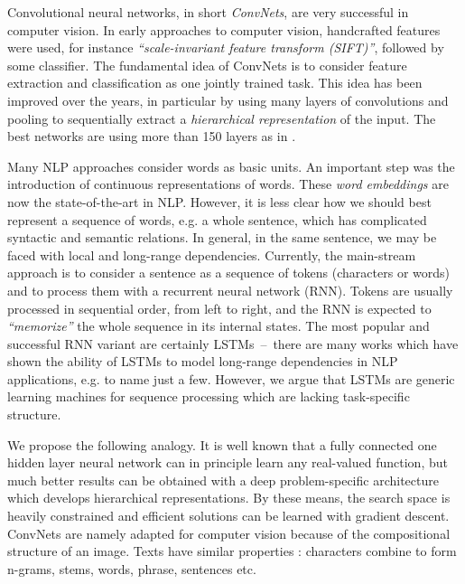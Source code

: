 \documentclass[a4paper,11pt]{article}
\newcommand{\eg}{e.g. }
\begin{document}
Convolutional neural networks, in short \textit{ConvNets}, are very successful
in computer vision. In early approaches to computer vision, handcrafted
features were used, for instance \textit{``scale-invariant feature transform (SIFT)''}\cite{lowe2004distinctive},
followed by some classifier.  The fundamental idea of ConvNets\cite{lecun1998gradient} is to consider
feature extraction and classification as one jointly trained task.  This idea
has been improved over the years, in particular by using many layers of
convolutions and pooling to sequentially extract a \textit{hierarchical representation}\cite{zeiler2014visualizing} of the input.  The best networks are using more than 150 layers as in
\cite{He:2015:resnet,He:2016:preresnet}.

Many NLP approaches consider words as basic units. An important step was the
introduction of continuous representations of words\cite{bengio2003neural}. These \textit{word
embeddings} are now the state-of-the-art in NLP.
However, it is less clear how we should best represent a sequence of words, \eg
a whole sentence, which has complicated syntactic and semantic relations. In
general, in the same sentence, we may be faced with local and long-range
dependencies.  Currently, the main-stream approach is to consider a sentence as
a sequence of tokens (characters or words) and to process them with a recurrent
neural network (RNN).  Tokens are usually processed in sequential order, from
left to right, and the RNN is expected to \textit{``memorize''} the whole
sequence in its internal states.  The most popular and successful RNN variant
are certainly LSTMs\cite{hochreiter1997long}~--~there are many works
which have shown the ability of LSTMs to model long-range dependencies in NLP
applications, \eg  \cite{Sundermeyer:2012:is_lstm,Sutskever:2014:nips_nntrans}
to name just a few.  However, we argue that LSTMs are generic learning machines
for sequence processing which are lacking task-specific structure.

We propose the following analogy. 
It is well known that a fully connected one
hidden layer neural network can in principle learn any real-valued function,
but much better results can be obtained with a deep problem-specific
architecture which develops hierarchical representations. By these means, the
search space is heavily constrained and efficient solutions can be learned with
gradient descent.  ConvNets are namely adapted for computer vision because of the compositional structure of an image. Texts have similar properties : characters combine to form n-grams, stems, words, phrase, sentences etc.
\end{document}
